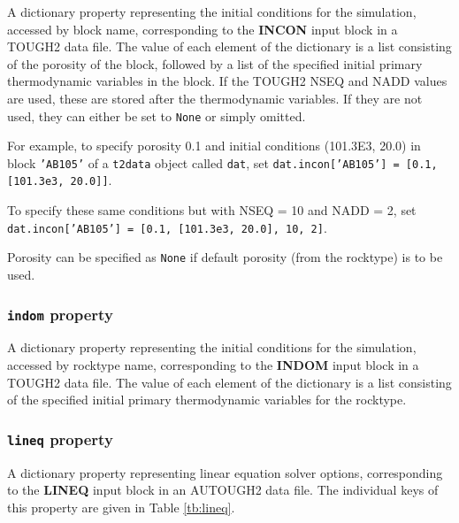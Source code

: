A dictionary property representing the initial conditions for the simulation, accessed by block name, corresponding to the \textbf{INCON} input block in a TOUGH2 data file.  The value of each element of the dictionary is a list consisting of the porosity of the block, followed by a list of the specified initial primary thermodynamic variables in the block. If the TOUGH2 NSEQ and NADD values are used, these are stored after the thermodynamic variables. If they are not used, they can either be set to \texttt{None} or simply omitted.

For example, to specify porosity 0.1 and initial conditions (101.3E3, 20.0) in block \texttt{'AB105'} of a \texttt{t2data} object called \texttt{dat}, set \texttt{dat.incon['AB105'] = [0.1, [101.3e3, 20.0]]}.

To specify these same conditions but with NSEQ = 10 and NADD = 2, set \texttt{dat.incon['AB105'] = [0.1, [101.3e3, 20.0], 10, 2]}.

Porosity can be specified as \texttt{None} if default porosity (from the rocktype) is to be used.

\begin{snugshade}
\subsubsection{\texttt{indom} property}
\end{snugshade}
\label{sec:t2data:indom}

A dictionary property representing the initial conditions for the simulation, accessed by rocktype name, corresponding to the \textbf{INDOM} input block in a TOUGH2 data file.  The value of each element of the dictionary is a list consisting of the specified initial primary thermodynamic variables for the rocktype.

\begin{snugshade}
\subsubsection{\texttt{lineq} property}
\end{snugshade}
\label{sec:t2data:lineq}

A dictionary property representing linear equation solver options, corresponding to the \textbf{LINEQ} input block in an AUTOUGH2 data file.  The individual keys of this property are given in Table \ref{tb:lineq}.

